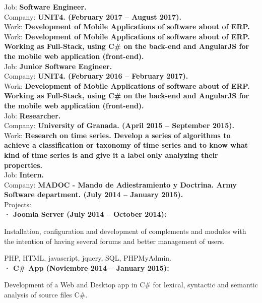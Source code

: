 \documentclass	[10pt,a4paper,oneside]{article}
\begin{document}
Job: \textbf{Software Engineer.}\\
Company: \textbf{UNIT4. (February 2017 – August 2017).}\\
Work: \textbf{Development of Mobile Applications of software about of ERP.}\\
Work: \textbf{Development of Mobile Applications of software about of ERP. Working as Full-Stack, using C\# on the back-end and AngularJS for the mobile web application (front-end).}\\

Job: \textbf{Junior Software Engineer.}\\
Company: \textbf{UNIT4. (February 2016 – February 2017).}\\
Work: \textbf{Development of Mobile Applications of software about of ERP. Working as Full-Stack, using C\# on the back-end and AngularJS for the mobile web application (front-end).}\\

Job: \textbf{Researcher.}\\
Company: \textbf{University of Granada. (April 2015 – September 2015).}\\
Work: \textbf{Research on time series. Develop a series of algorithms to achieve a classification or taxonomy of time series and to know what kind of time series is and give it a label only analyzing their properties.}\\

Job: \textbf{Intern.}\\
Company: \textbf{MADOC - Mando de Adiestramiento y Doctrina. Army Software department. (July 2014 – January 2015).}\\
Projects:\\
\hspace*{1cm}\textbf{· Joomla Server (July 2014 – October 2014):}\par
{\addtolength{\leftskip}{2cm}Installation, configuration and development of complements and modules with the intention of having several forums and better management of users.\par}
\hspace*{2cm}PHP, HTML, javascript, jquery, SQL, PHPMyAdmin.\\
\hspace*{1cm}\textbf{· C\# App (Noviembre 2014 – January 2015):}\par
{\addtolength{\leftskip}{2cm}
Development of a Web and Desktop app in C\# for lexical, syntactic and semantic analysis of source files C\#.\\\\\\\\\par}
\end{document}
